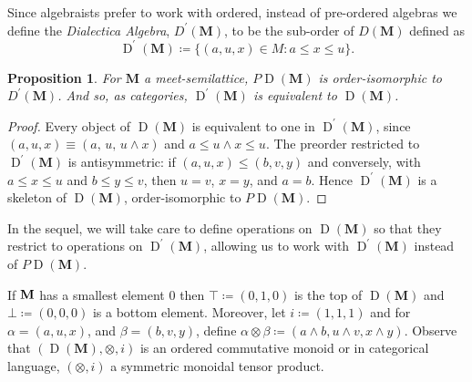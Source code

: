 \documentclass[reqno]{amsart}
\theoremstyle{plain}
\newtheorem{prop}[thm]{Proposition}
\theoremstyle{definition}
\newcommand{\Valeria}[1]{\textcolor{red}{Valeria: #1}}
\DeclareMathOperator{\D}{D}
\newcommand{\cf}[1]{\mathbf{#1}}
\begin{document}

Since algebraists prefer to work with ordered, instead of pre-ordered algebras we define the \textit{Dialectica Algebra}, $ D^{\prime}(\cf{M}) $, to be the sub-order of $D(\cf{M}) $ defined as 
\begin{equation*}
    \D^{\prime}(\cf{M}) \coloneqq \{ (a,u,x) \in M : a \leq x \leq u \}. 
\end{equation*}
\begin{prop}\label{prop: PD iso Dprime}
    For $\cf{M} $ a meet-semilattice, $P \D (\cf{M}) $ is order-isomorphic to $ D^{\prime}(\cf{M})$. And so, as categories, $\D^{\prime}(\cf{M}) $ is equivalent to $\D(\cf{M}) $.
\end{prop}
\begin{proof}
    Every object of $\D(\cf{M})$ is equivalent to one in $\D^{\prime}(\cf{M})$, since $(a,u,x) \equiv (a,\, u,\, u\wedge x)$ and $a \leq u\wedge x \leq u$. The preorder restricted to $\D^{\prime}(\cf{M})$ is antisymmetric: if $(a,u,x) \leq (b,v,y)$ and conversely, with $a\leq x\leq u$ and $b\leq y\leq v$, then $u=v$, $x=y$, and $a=b$. Hence $\D^{\prime}(\cf{M})$ is a skeleton of $\D(\cf{M})$, order-isomorphic to $P\D(\cf{M})$.
\end{proof}

In the sequel, we will take care to define operations on $ \D(\cf{M})$ so that they restrict to operations on $ \D^{\prime}(\cf{M}) $, allowing us to work with $ \D^{\prime}(\cf{M}) $ instead of $P \D(\cf{M})$.


%

If $\bf{M}$ has a smallest element $ 0 $ then $\top \coloneqq (0,1,0)$ is the top of $\D (\cf{M}) $ and $\bot \coloneqq (0,0,0) $ is a bottom element. Moreover, let $ i \coloneqq (1,1,1) $ and for $ \alpha = (a,u,x) $, and $\beta = (b,v,y) $, define $\alpha \otimes \beta \coloneqq (a \wedge b, u \wedge v, x \wedge y)$. Observe that $ (\D(\cf{M}),\otimes, i) $ is an ordered commutative monoid or in categorical language, $(\otimes, i)$ a symmetric monoidal tensor product.
\end{document}
